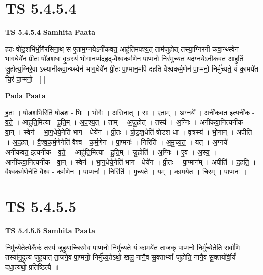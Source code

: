 \documentclass[17pt]{extarticle}
\begin{document}

\section{ TS 5.4.5.4 }

\textbf{TS 5.4.5.4 } \newline
\textbf{Samhita Paata} \newline

ह॒तः षो॑ड॒शभि॑र्भो॒गैर॑सिना॒थ् स ए॒ताम॒ग्नयेऽनी॑कवत॒ आहु॑तिमपश्य॒त् ताम॑जुहो॒त् तस्या॒ग्निरनी॑ कवा॒न्थ्स्वेन॑ भाग॒धेये॑न प्री॒तः षो॑डश॒धा वृ॒त्रस्य॑ भो॒गानप्य॑दहद्-वैश्वकर्म॒णेन॑ पा॒प्मनो॒ निर॑मुच्यत॒ यद॒ग्नयेऽनी॑कवत॒ आहु॑तिं जु॒होत्य॒ग्निरे॒वा-ऽस्यानी॑कवा॒न्थ्स्वेन॑ भाग॒धेये॑न प्री॒तः पा॒प्मान॒मपि॑ दहति वैश्वकर्म॒णेन॑ पा॒प्मनो॒ निर्मु॑च्यते॒ यं का॒मये॑त चि॒रं पा॒प्मनो॒ - [  ] \newline

\textbf{Pada Paata} \newline

ह॒तः । षो॒ड॒शभि॒रिति॑ षोड॒श - भिः॒ । भो॒गैः । अ॒सि॒ना॒त् । सः । ए॒ताम् । अ॒ग्नये᳚ । अनी॑कवत॒ इत्यनी॑क - व॒ते॒ । आहु॑ति॒मित्या - हु॒ति॒म् । अ॒प॒श्य॒त् । ताम् । अ॒जु॒हो॒त् । तस्य॑ । अ॒ग्निः । अनी॑कवा॒नित्यनी॑क - वा॒न् । स्वेन॑ । भा॒ग॒धेये॒नेति॑ भाग - धेये॑न । प्री॒तः । षो॒ड॒श॒धेति॑ षोडश-धा । वृ॒त्रस्य॑ । भो॒गान् । अपीति॑ । अ॒द॒ह॒त् । वै॒श्व॒क॒र्म॒णेनेति॑ वैश्व - क॒र्म॒णेन॑ । पा॒प्मनः॑ । निरिति॑ । अ॒मु॒च्य॒त॒ । यत् । अ॒ग्नये᳚ । अनी॑कवत॒ इत्यनी॑क - व॒ते॒ । आहु॑ति॒मित्या - हु॒ति॒म् । जु॒होति॑ । अ॒ग्निः । ए॒व । अ॒स्य॒ । आनी॑कवा॒नित्यनी॑क - वा॒न् । स्वेन॑ । भा॒ग॒धेये॒नेति॑ भाग - धेये॑न । प्री॒तः । पा॒प्मान᳚म् । अपीति॑ । द॒ह॒ति॒ । वै॒श्व॒क॒र्म॒णेनेति॑ वैश्व - क॒र्म॒णेन॑ । पा॒प्मनः॑ । निरिति॑ । मु॒च्य॒ते॒ । यम् । का॒मये॑त । चि॒रम् । पा॒प्मनः॑ ।  \newline





\section{ TS 5.4.5.5 }

\textbf{TS 5.4.5.5 } \newline
\textbf{Samhita Paata} \newline

निर्मु॑च्ये॒तेत्येकै॑कं॒ तस्य॑ जुहुयाच्चि॒रमे॒व पा॒प्मनो॒ निर्मु॑च्यते॒ यं का॒मये॑त ता॒जक् पा॒प्मनो॒ निर्मु॑च्ये॒तेति॒ सर्वा॑णि॒ तस्या॑नु॒द्रुत्य॑ जुहुयात् ता॒जगे॒व पा॒प्मनो॒ निर्मु॑च्य॒तेऽथो॒ खलु॒ नानै॒व सू॒क्ताभ्यां᳚ जुहोति॒ नानै॒व सू॒क्तयो᳚र्वी॒र्यं॑ दधा॒त्यथो॒ प्रति॑ष्ठित्यै ॥ \newline
\end{document}
